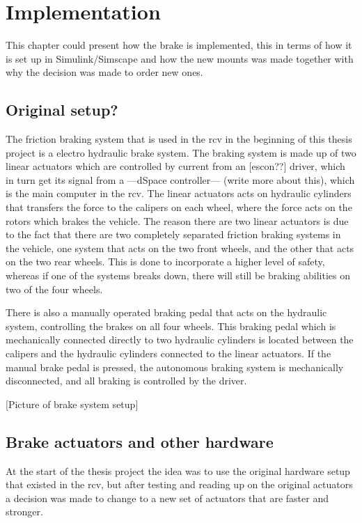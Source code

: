 \documentclass[a4paper,11pt]{kth-mag}
\begin{document}

\chapter{Implementation}

This chapter could present how the brake is implemented, this in terms of how it is set up in Simulink/Simscape and how the new mounts was made together with why the decision was made to order new ones.

\section{Original setup?}
The friction braking system that is used in the \gls{rcv} in the beginning of this thesis project is a electro hydraulic brake system. The braking system is made up of two linear actuators which are controlled by current from an [escon??] driver, which in turn get its signal from a ---dSpace controller--- (write more about this), which is the main computer in the \gls{rcv}. The linear actuators acts on hydraulic cylinders that transfers the force to the calipers on each wheel, where the force acts on the rotors which brakes the vehicle. The reason there are two linear actuators is due to the fact that there are two completely separated friction braking systems in the vehicle, one system that acts on the two front wheels, and the other that acts on the two rear wheels. This is done to incorporate a higher level of safety, whereas if one of the systems breaks down, there will still be braking abilities on two of the four wheels. \newline

There is also a manually operated braking pedal that acts on the hydraulic system, controlling the brakes on all four wheels. This braking pedal which is mechanically connected directly to two hydraulic cylinders is located between the calipers and the hydraulic cylinders connected to the linear actuators. If the manual brake pedal is pressed, the autonomous braking system is mechanically disconnected, and all braking is controlled by the driver. \newline

[Picture of brake system setup]

\section{Brake actuators and other hardware}
At the start of the thesis project the idea was to use the original hardware setup that existed in the \gls{rcv}, but after testing and reading up on the original actuators a decision was made to change to a new set of actuators that are faster and stronger. 
\end{document}
